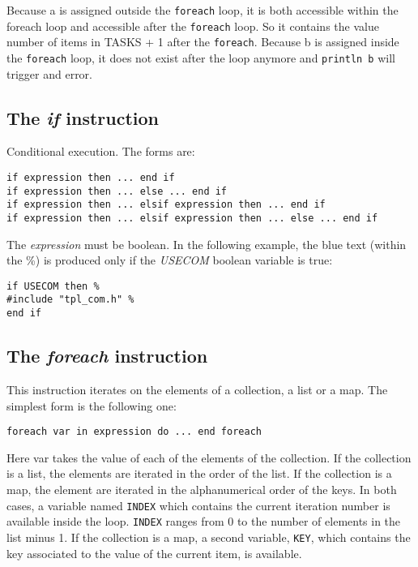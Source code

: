 \documentclass[11pt]{article}
\newcommand{\var}[1]{{\ttfamily\em #1}}
\begin{document}
Because a is assigned outside the {\tt foreach} loop, it is both accessible within the foreach loop and accessible after the {\tt foreach} loop. So it contains the value number of items in TASKS + 1 after the {\tt foreach}. Because b is assigned inside the {\tt foreach} loop, it does not exist after the loop anymore and {\tt println b} will trigger and error.

\subsection{The {\em if} instruction}

Conditional execution. The forms are:

\begin{lstlisting}
if expression then ... end if
if expression then ... else ... end if
if expression then ... elsif expression then ... end if
if expression then ... elsif expression then ... else ... end if
\end{lstlisting}    

The {\em expression} must be boolean. In the following example, the blue text (within the \%) is produced only if the \var{USECOM} boolean variable is true:

\begin{lstlisting}
if USECOM then %
#include "tpl_com.h" %
end if
\end{lstlisting}

\subsection{The {\em foreach} instruction}

This instruction iterates on the elements of a collection, a list or a map. The simplest form is the following one:

\begin{lstlisting}
foreach var in expression do ... end foreach
\end{lstlisting}

Here var takes the value of each of the elements of the collection. If the collection is a list, the elements are iterated in the order of the list. If the collection is a map, the element are iterated in the alphanumerical order of the keys. In both cases, a variable named {\tt INDEX} which contains the current iteration number is available inside the loop. {\tt INDEX} ranges from 0 to the number of elements in the list minus 1. If the collection is a map, a second variable, {\tt KEY}, which contains the key associated to the value of the current item, is available.
\end{document}
